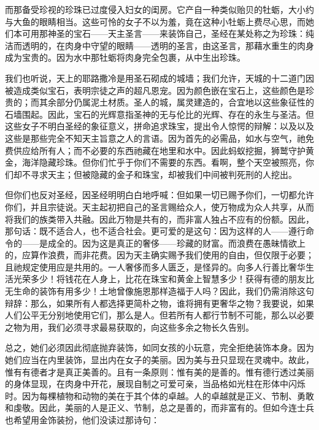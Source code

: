 而那备受珍视的珍珠已过度侵入妇女的闺房。它产自一种类似贻贝的牡蛎，大小约与大鱼的眼睛相当。这些可怜的女子不以为羞，竟在这种小牡蛎上费尽心思，而她们本可用那神圣的宝石——天主圣言——来装饰自己，圣经在某处称之为珍珠：纯洁而透明的，在肉身中守望的眼睛——透明的圣言，由这圣言，那藉水重生的肉身成为宝贵的。因为水中那牡蛎将肉身完全包裹，从中生出珍珠。\par

我们也听说，天上的耶路撒冷是用圣石砌成的城墙；我们允许，天城的十二道门因被造成类似宝石，表明宗徒之声的超凡恩宠。因为颜色嵌在宝石上，这些颜色是珍贵的；而其余部分仍属泥土材质。圣人的城，属灵建造的，合宜地以这些象征性的石墙围起。因此，宝石的光辉意指圣神的无与伦比的光辉、存在的永生与圣洁。但这些女子不明白圣经的象征意义，拼命追求珠宝，提出令人惊愕的辩解：以及以及这些是那些完全不知天主旨意之人的言语。因为首先的必需品，如水与空气，祂免费供应给所有人；而不必要的东西祂藏在地里和水中。因此蚂蚁挖掘，狮鹫守护黄金，海洋隐藏珍珠。但你们忙乎于你们不需要的东西。看啊，整个天空被照亮，你们却不寻求天主；但被隐藏的金子和珠宝，却被我们中间被判死刑的人挖出。\par

但你们也反对圣经，因圣经明明白白地呼喊：但如果一切已赐予你们，一切都允许你们，并且宗徒说。天主起初把自己的圣言赐给众人，使万物成为众人共享，从而将我们的族类带入共融。因此万物是共有的，而非富人独占不应有的份额。因此，那句话：既不适合人，也不适合社会。更可爱的是这句：因为这样的人——遵行命令的——是成全的。因为这是真正的奢侈——珍藏的财富。而浪费在愚昧情欲上的，应算作浪费，而非花费。因为天主确实赐予我们使用的自由，但仅限于必要；且祂规定使用应是共用的。一人奢侈而多人匮乏，是怪异的。向多人行善比奢华生活光荣多少！将钱花在人身上，比花在珠宝和黄金上智慧多少！获得有德的朋友比无生命的装饰有用多少！土地曾像施恩那样造福于人吗？因此，我们仍需消除这句辩辞：那么，如果所有人都选择更简朴之物，谁将拥有更奢华之物？我要说，如果人们公平无分别地使用它们，那么是人。但若所有人都行节制不可能，那么以必要之物为用，我们必须寻求最易获取的，向这些多余之物长久告别。\par

总之，她们必须因此彻底抛弃装饰，如同女孩的小玩意，完全拒绝装饰本身。因为她们应当在内里装饰，显出内在女子的美丽。因为美与丑只显现在灵魂中。故此，惟有有德者才是真正美善的。且有一条原则：惟有美的是善的。惟有德行透过美丽的身体显现，在肉身中开花，展现自制之可爱可亲，当品格如光柱在形体中闪烁时。因为每棵植物和动物的美在于其个体的卓越。人的卓越就是正义、节制、勇敢和虔敬。因此，美丽的人是正义、节制，总之是善的，而非富有的。但如今连士兵也希望用金饰装扮，他们没读过那诗句：\par

